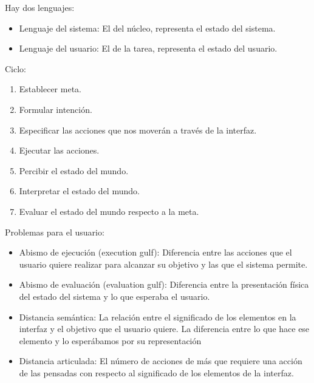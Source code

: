 \documentclass[12pt, twoside, openright]{report} %
\begin{document}
	Hay dos lenguajes:
	\vspace{-0.5cm}

    \begin{itemize}
    
    \item
      Lenguaje del sistema: El del núcleo, representa el estado del
      sistema.
    \item
      Lenguaje del usuario: El de la tarea, representa el estado del
      usuario.
    \end{itemize}

	Ciclo:
	\vspace{-0.5cm}

    \begin{enumerate}
    \def\labelenumi{\arabic{enumi}.}
    
    \item
      Establecer meta.
    \item
      Formular intención.
    \item
      Especificar las acciones que nos moverán a través de la interfaz.
    \item
      Ejecutar las acciones.
    \item
      Percibir el estado del mundo.
    \item
      Interpretar el estado del mundo.
    \item
      Evaluar el estado del mundo respecto a la meta.
    \end{enumerate}

	Problemas para el usuario:

    \begin{itemize}
    
    \item
      Abismo de ejecución (execution gulf): Diferencia entre las
      acciones que el usuario quiere realizar para alcanzar su objetivo
      y las que el sistema permite.
    \item
      Abismo de evaluación (evaluation gulf): Diferencia entre la
      presentación física del estado del sistema y lo que esperaba el
      usuario.
    \item
      Distancia semántica: La relación entre el significado de los
      elementos en la interfaz y el objetivo que el usuario quiere. La
      diferencia entre lo que hace ese elemento y lo esperábamos por su
      representación
    \item
      Distancia articulada: El número de acciones de más que requiere
      una acción de las pensadas con respecto al significado de los
      elementos de la interfaz.
    \end{itemize}
\end{document}
